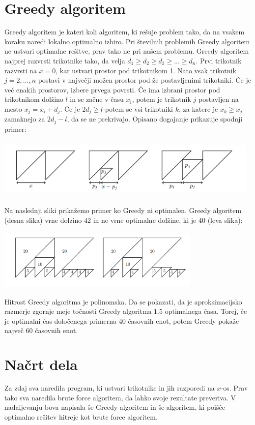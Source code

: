 \documentclass[a4paper,12pt]{article}
\theoremstyle{definition}
\theoremstyle{plain}
\begin{document}
\newpage
\section{Greedy algoritem}
Greedy algoritem je kateri koli algoritem, ki rešuje problem tako, da na vsakem koraku naredi lokalno optimalno izbiro. Pri številnih problemih Greedy algoritem ne ustvari optimalne rešitve, prav tako ne pri našem problemu. 
Greedy algoritem najprej razvrsti trikotnike tako, da velja \newline
$d_1 \geq d_2 \geq d_3 \geq ... \geq d_n$. Prvi trikotnik razvrsti na $x=0$, kar ustvari prostor pod trikotnikom 1.
Nato vsak trikotnik $j=2,...,n$ postavi v največji možen prostor pod že postavljenimi trikotniki. Če je več enakih prostorov, izbere prvega povrsti.
Če ima izbrani prostor pod trikotnikom dolžino $l$ in se začne v času $x_i$, potem je trikotnik $j$ postavljen na mesto $x_j=x_i+d_j$. Če je $2d_j \ge l$  potem se vsi trikotniki $k$, za katere je $x_k \ge x_j$ zamaknejo za $ 2d_j-l$, da se ne prekrivajo. Opisano 
dogajanje prikazuje spodnji primer:
\begin{center}
    \includegraphics[width=13cm, height=3cm]{greedy.png} 
 \end{center}
Na naslednji sliki prikažemo primer ko Greedy ni optimalen. Greedy algoritem (desna slika) vrne dolzino 42 in ne vrne optimalne dolžine, ki je 40 (leva slika):
\begin{center}
    \includegraphics[width=10cm, height=3cm]{primer_neoptimalnosti_greedy.png} 
 \end{center}
Hitrost Greedy algoritma je polinomska. Da se pokazati, da je aproksimacijsko razmerje zgornje meje točnosti Greedy algoritma $1.5$ optimalnega časa. Torej, če je optimalni čas določenega primerna
$40$ časovnih enot, potem Greedy pokaže največ $60$ časovnih enot.

\section{Načrt dela}
Za zdaj sva naredila program, ki ustvari trikotnike in jih razporedi na \newline $x$-os. Prav tako sva naredila brute force algoritem, da lahko svoje rezultate preveriva.
V nadaljevanju bova napisala še Greedy algoritem in še algoritem, ki poišče optimalno rešitev hitreje kot brute force algoritem.
\end{document}
